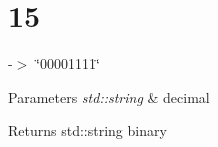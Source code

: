 \hypertarget{15-example}{}\section{15}
-\/$>$ \char`\"{}00001111\char`\"{} 
\begin{DoxyParams}{Parameters}
{\em std\+::string} & decimal \\
\hline
\end{DoxyParams}
\begin{DoxyReturn}{Returns}
std\+::string binary
\end{DoxyReturn}

\begin{DoxyCodeInclude}
\end{DoxyCodeInclude}
 
